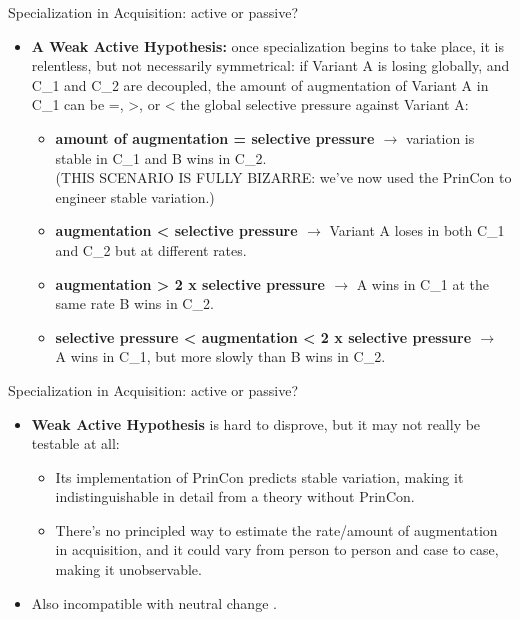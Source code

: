 \documentclass[hyperref={pdfpagelabels=false}]{beamer}
\begin{document}
\begin{frame}{Specialization in Acquisition: active or passive?}
		\begin{itemize}
			\item \textbf{A Weak Active Hypothesis:} once specialization begins to take place, it is relentless, but not necessarily symmetrical: if Variant A is losing globally, and C_1 and C_2 are decoupled, the amount of augmentation of Variant A in C_1 can be =, >, or < the global selective pressure against Variant A:			
			\begin{itemize}
					\item \textbf{amount of augmentation = selective pressure $\rightarrow$} variation is stable in C_1 and B wins in C_2.\\(THIS SCENARIO IS FULLY BIZARRE: we've now used the PrinCon to engineer stable variation.)
					\item \textbf{augmentation < selective pressure $\rightarrow$} Variant A loses in both C_1 and C_2 but at different rates.
					\item \textbf{augmentation > 2 x selective pressure $\rightarrow$} A wins in C_1 at the same rate B wins in C_2.
					\item \textbf{selective pressure < augmentation < 2 x selective pressure $\rightarrow$} A wins in C_1, but more slowly than B wins in C_2.			
			\end{itemize}
		\end{itemize}
\end{frame}

\begin{frame}{Specialization in Acquisition: active or passive?}
		\begin{itemize}
			\item \textbf{Weak Active Hypothesis} is hard to disprove, but it may not really be testable at all:
			\begin{itemize}
				\item Its implementation of PrinCon predicts stable variation, making it indistinguishable in detail from a theory without PrinCon.
				\item There's no principled way to estimate the rate/amount of augmentation in acquisition, and it could vary from person to person and case to case, making it unobservable.
			\end{itemize}
			\item Also incompatible with neutral change \citep{kauhanen2016}.
		\end{itemize}
\end{frame}
\end{document}
